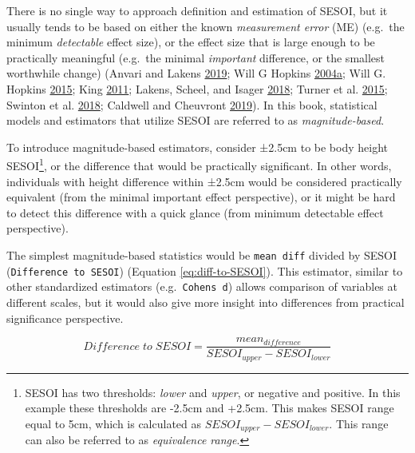 \documentclass[
]{book}
\begin{document}
There is no single way to approach definition and estimation of SESOI, but it usually tends to be based on either the known \emph{measurement error} (ME) (e.g.~the minimum \emph{detectable} effect size), or the effect size that is large enough to be practically meaningful (e.g.~the minimal \emph{important} difference, or the smallest worthwhile change) (Anvari and Lakens \protect\hyperlink{ref-anvariUsingAnchorBasedMethods2019}{2019}; Will G Hopkins \protect\hyperlink{ref-hopkinsHowInterpretChanges2004}{2004}\protect\hyperlink{ref-hopkinsHowInterpretChanges2004}{a}; Will G. Hopkins \protect\hyperlink{ref-hopkinsIndividualResponsesMade2015}{2015}; King \protect\hyperlink{ref-kingPointMinimalImportant2011}{2011}; Lakens, Scheel, and Isager \protect\hyperlink{ref-lakensEquivalenceTestingPsychological2018}{2018}; Turner et al. \protect\hyperlink{ref-turnerDataAnalysisStrength2015}{2015}; Swinton et al. \protect\hyperlink{ref-swintonStatisticalFrameworkInterpret2018}{2018}; Caldwell and Cheuvront \protect\hyperlink{ref-caldwellBasicStatisticalConsiderations2019}{2019}). In this book, statistical models and estimators that utilize SESOI are referred to as \emph{magnitude-based}.

To introduce magnitude-based estimators, consider ±2.5cm to be body height SESOI\footnote{SESOI has two thresholds: \emph{lower} and \emph{upper}, or negative and positive. In this example these thresholds are -2.5cm and +2.5cm. This makes SESOI range equal to 5cm, which is calculated as \(SESOI_{upper} - SESOI_{lower}\). This range can also be referred to as \emph{equivalence range}.}, or the difference that would be practically significant. In other words, individuals with height difference within ±2.5cm would be considered practically equivalent (from the minimal important effect perspective), or it might be hard to detect this difference with a quick glance (from minimum detectable effect perspective).

The simplest magnitude-based statistics would be \texttt{mean\ diff} divided by SESOI (\texttt{Difference\ to\ SESOI}) (Equation \eqref{eq:diff-to-SESOI}). This estimator, similar to other standardized estimators (e.g.~\texttt{Cohen\textquotesingle{}s\ d}) allows comparison of variables at different scales, but it would also give more insight into differences from practical significance perspective.

\begin{equation}
  Difference\;to\;SESOI = \frac{mean_{difference}}{SESOI_{upper} - SESOI_{lower}}
  \label{eq:diff-to-SESOI}
\end{equation}
\end{document}
